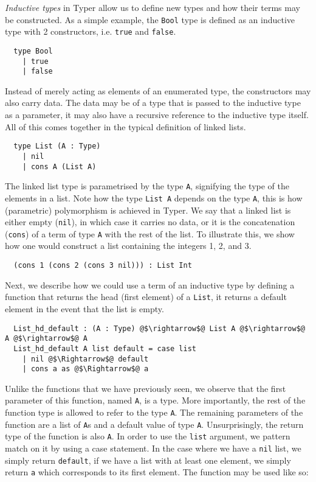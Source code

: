 \documentclass[12pt,twoside,maitrise]{dms}
\theoremstyle{definition}
\numberwithin{equation}{section}
\numberwithin{table}{chapter}
\numberwithin{figure}{chapter}
\newcommand\kw[1] {\textsf{#1}}
\newcommand\id[1] {\texttt{#1}}
\begin{document}
\emph{Inductive types} in Typer allow us to define new types and how their
terms may be constructed. As a simple example, the \id{Bool} type is defined as
an inductive type with 2 constructors, i.e. \id{true} and \id{false}.

\begin{verbatim}
  type Bool
    | true
    | false
\end{verbatim}

Instead of merely acting as elements of an enumerated type, the constructors
may also carry data. The data may be of a type that is passed to the inductive
type as a parameter, it may also have a recursive reference to the inductive
type itself. All of this comes together in the typical definition of linked
lists.

\begin{verbatim}
  type List (A : Type)
    | nil
    | cons A (List A)
\end{verbatim}

The linked list type is parametrised by the type \id{A}, signifying the type of
the elements in a list. Note how the type \id{List A} depends on the type
\id{A}, this is how (parametric) polymorphism is achieved in Typer. We say that
a linked list is either empty (\id{nil}), in which case it carries no data, or
it is the concatenation (\id{cons}) of a term of type \id{A} with the rest of
the list. To illustrate this, we show how one would construct a list containing
the integers 1, 2, and 3.

\begin{verbatim}
  (cons 1 (cons 2 (cons 3 nil))) : List Int
\end{verbatim}

Next, we describe how we could use a term of an inductive type by defining a
function that returns the head (first element) of a \id{List}, it returns a
default element in the event that the list is empty.

\begin{verbatim}
  List_hd_default : (A : Type) @$\rightarrow$@ List A @$\rightarrow$@ A @$\rightarrow$@ A
  List_hd_default A list default = case list
    | nil @$\Rightarrow$@ default
    | cons a as @$\Rightarrow$@ a
\end{verbatim}

Unlike the functions that we have previously seen, we observe that the first
parameter of this function, named \id{A}, is a type. More importantly, the rest
of the function type is allowed to refer to the type \id{A}. The remaining
parameters of the function are a list of \id{A}s and a default value of type
\id{A}. Unsurprisingly, the return type of the function is also \id{A}. In
order to use the \id{list} argument, we pattern match on it by using a
\kw{case} statement. In the case where we have a \id{nil} list, we simply
return \id{default}, if we have a list with at least one element, we simply
return \id{a} which corresponds to its first element. The function may be used
like so:
\end{document}
